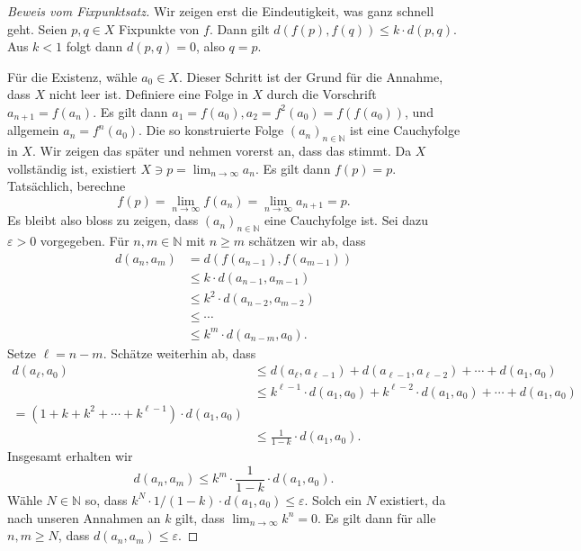 \documentclass[../main.tex]{subfiles}
\begin{document}
\begin{proof}[Beweis vom Fixpunktsatz]
  Wir zeigen erst die Eindeutigkeit,
  was ganz schnell geht.
  Seien $p, q \in X$ Fixpunkte von $f$.
  Dann gilt $d(f(p), f(q)) \leq k \cdot d(p, q)$.
  Aus $k < 1$ folgt dann $d(p, q) = 0$,
  also $q = p$.

  Für die Existenz, wähle $a_0 \in X$. Dieser
  Schritt ist der Grund für die Annahme,
  dass $X$ nicht leer ist.
  Definiere eine Folge in $X$ durch die
  Vorschrift $a_{n+1}= f(a_n)$.
  Es gilt dann $a_1 = f(a_0), a_2 = f^2(a_0) = f(f(a_0))$,
  und allgemein $a_n = f^n(a_0)$.
  Die so konstruierte Folge ${(a_{n})}_{n \in \mathbb{N}}$ 
  ist eine Cauchyfolge in $X$. Wir zeigen das später
  und nehmen vorerst an, dass das stimmt.
  Da $X$ vollständig ist, existiert $X \ni p = \lim_{n \to \infty} a_n$.
  Es gilt dann $f(p) = p$.
  Tatsächlich, berechne
  \[
  f(p) = \lim_{n \to \infty} f(a_n) = \lim_{n \to \infty}a_{n+1} = p.
  \]
  Es bleibt also bloss zu zeigen,
  dass $ {(a_n)}_{n \in \mathbb{N}}$
  eine Cauchyfolge ist.
  Sei dazu $\varepsilon > 0$ vorgegeben.
  Für $n, m \in \mathbb{N}$ mit $n \geq m$ 
  schätzen wir ab, dass
  \begin{align*}
    d(a_n, a_m)
    & = d(f(a_{n-1}), f(a_{m-1}))\\
    & \leq k \cdot d(a_{n-1}, a_{m-1}) \\
    &\leq k^2 \cdot d(a_{n-2}, a_{m-2})\\
    &\leq \cdots \\
    &\leq k^m \cdot d(a_{n-m}, a_0).
  \end{align*}
  Setze $\ell = n -m $.
  Schätze weiterhin ab, dass
  \begin{align*}
    d(a_{\ell}, a_0) 
    &\leq d(a_\ell, a_{\ell - 1})
    + d(a_{\ell - 1}, a_{\ell-2}) + \cdots + d(a_1, a_0)\\
    &\leq k^{\ell-1} \cdot d(a_{1}, a_{0})
    + k^{\ell - 2} \cdot d(a_1, a_0)
    + \cdots
    + d(a_1, a_0) \\
    = (1 + k + k^2 + \cdots + k^{\ell-1})
    \cdot d(a_1, a_0) \\
    &\leq \frac{1}{1-k} \cdot d(a_1, a_0).
  \end{align*}
  Insgesamt erhalten wir
  \[
    d(a_n, a_m) \leq k^m \cdot \frac{1}{1-k} \cdot d(a_1, a_0).
  \]
  Wähle $N \in \mathbb{N}$ so,
  dass $k^N \cdot 1/(1-k) \cdot d(a_1, a_0) \leq \varepsilon$.
  Solch ein $N$ existiert, da 
  nach unseren Annahmen an $k$ gilt,
  dass $\lim_{n \to \infty} k^n = 0$.
  Es gilt dann für alle $n, m \geq N$, dass
  $d(a_n, a_m) \leq \varepsilon$.
\end{proof}
\end{document}
